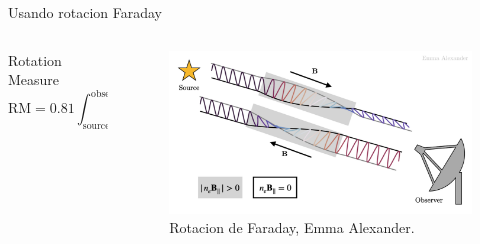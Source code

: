 \documentclass[xetex,aspectratio=169]{beamer}
\begin{document}
	\begin{frame}{Usando rotacion Faraday}
		\begin{columns}
			
			\begin{column}{0.55\textwidth}
				
				
				
				\begin{block}{Rotation Measure}
					\begin{equation*}
						\text{RM} = 0.81 \int_{\text{source}}^{\text{observer}} n_e(r) B_{||}(r) \cdot dr\; \text{rad}\;\text{m}^{-2}
					\end{equation*}
				\end{block}
				
			\end{column}
			
			\begin{column}{0.45\textwidth}
				\begin{figure}
					\centering
					\includegraphics[width=\textwidth, keepaspectratio]{figures/faraday_rotation/faraday_rot.png}
					\caption*{Rotacion de Faraday, Emma Alexander.}
				\end{figure}
			\end{column}
		\end{columns}
		
	\end{frame}
	
\end{document}
